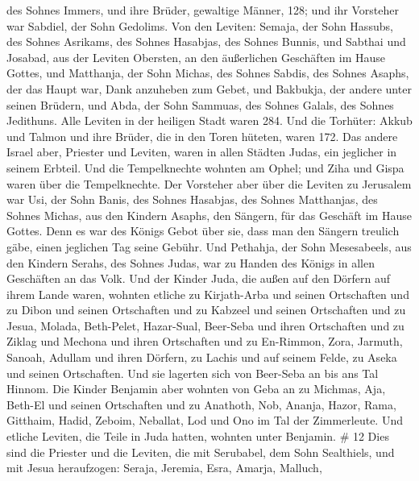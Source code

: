 des Sohnes Immers,  und ihre Brüder, gewaltige Männer, 128;
und ihr Vorsteher war Sabdiel, der Sohn Gedolims.  Von den
Leviten: Semaja, der Sohn Hassubs, des Sohnes Asrikams, des Sohnes
Hasabjas, des Sohnes Bunnis,  und Sabthai und Josabad, aus
der Leviten Obersten, an den äußerlichen Geschäften im Hause Gottes,
 und Matthanja, der Sohn Michas, des Sohnes Sabdis, des
Sohnes Asaphs, der das Haupt war, Dank anzuheben zum Gebet, und
Bakbukja, der andere unter seinen Brüdern, und Abda, der Sohn Sammuas,
des Sohnes Galals, des Sohnes Jedithuns.  Alle Leviten in
der heiligen Stadt waren 284.  Und die Torhüter: Akkub und
Talmon und ihre Brüder, die in den Toren hüteten, waren 172.
 Das andere Israel aber, Priester und Leviten, waren in
allen Städten Judas, ein jeglicher in seinem Erbteil.  Und
die Tempelknechte wohnten am Ophel; und Ziha und Gispa waren über die
Tempelknechte.  Der Vorsteher aber über die Leviten zu
Jerusalem war Usi, der Sohn Banis, des Sohnes Hasabjas, des Sohnes
Matthanjas, des Sohnes Michas, aus den Kindern Asaphs, den Sängern, für
das Geschäft im Hause Gottes.  Denn es war des Königs Gebot
über sie, dass man den Sängern treulich gäbe, einen jeglichen Tag seine
Gebühr.  Und Pethahja, der Sohn Mesesabeels, aus den
Kindern Serahs, des Sohnes Judas, war zu Handen des Königs in allen
Geschäften an das Volk.  Und der Kinder Juda, die außen auf
den Dörfern auf ihrem Lande waren, wohnten etliche zu Kirjath-Arba und
seinen Ortschaften und zu Dibon und seinen Ortschaften und zu Kabzeel
und seinen Ortschaften  und zu Jesua, Molada, Beth-Pelet,
 Hazar-Sual, Beer-Seba und ihren Ortschaften 
und zu Ziklag und Mechona und ihren Ortschaften  und zu
En-Rimmon, Zora, Jarmuth,  Sanoah, Adullam und ihren
Dörfern, zu Lachis und auf seinem Felde, zu Aseka und seinen
Ortschaften. Und sie lagerten sich von Beer-Seba an bis ans Tal Hinnom.
 Die Kinder Benjamin aber wohnten von Geba an zu Michmas,
Aja, Beth-El und seinen Ortschaften  und zu Anathoth, Nob,
Ananja,  Hazor, Rama, Gitthaim,  Hadid,
Zeboim, Neballat,  Lod und Ono im Tal der Zimmerleute.
 Und etliche Leviten, die Teile in Juda hatten, wohnten
unter Benjamin. \# 12  Dies sind die Priester und die
Leviten, die mit Serubabel, dem Sohn Sealthiels, und mit Jesua
heraufzogen: Seraja, Jeremia, Esra,  Amarja, Malluch,
